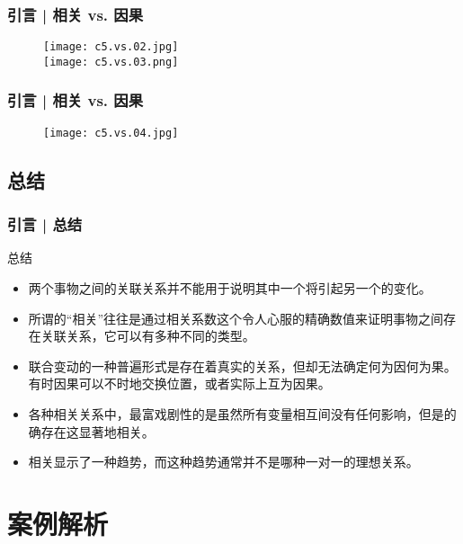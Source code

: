 \begin{frame}
  \frametitle{引言 | 相关 vs. 因果}
  \begin{figure}
    \centering
    \texttt{[image: c5.vs.02.jpg]}\\
    \texttt{[image: c5.vs.03.png]}
  \end{figure}
\end{frame}

\begin{frame}
  \frametitle{引言 | 相关 vs. 因果}
  \begin{figure}
    \centering
    \texttt{[image: c5.vs.04.jpg]}
  \end{figure}
\end{frame}

\subsection{总结}
\begin{frame}
  \frametitle{引言 | 总结}
  \begin{block}{总结}
    \begin{itemize}
      \item 两个事物之间的关联关系并不能用于说明其中一个将引起另一个的变化。
      \item 所谓的“相关”往往是通过相关系数这个令人心服的精确数值来证明事物之间存在关联关系，它可以有多种不同的类型。
      \item 联合变动的一种普遍形式是存在着真实的关系，但却无法确定何为因何为果。有时因果可以不时地交换位置，或者实际上互为因果。
      \item 各种相关关系中，最富戏剧性的是虽然所有变量相互间没有任何影响，但是的确存在这显著地相关。
      \item 相关显示了一种趋势，而这种趋势通常并不是哪种一对一的理想关系。
    \end{itemize}
  \end{block}
\end{frame}

\section{案例解析}
